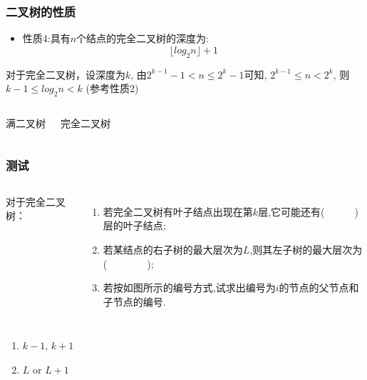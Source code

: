 \begin{frame}[fragile]
  \frametitle{二叉树的性质}
  \begin{itemize}
  \item 性质4:具有$n$个结点的完全二叉树的深度为:
    \[ \biggl\lfloor {log_2 n} \biggr\rfloor + 1 \] 
  \end{itemize}
  \small
  对于完全二叉树，设深度为$k$, 由$2^{k-1}-1 < n \leq 2^k - 1$可知,
  $2^{k-1} \leq n <2^k$, 则 $k-1 \leq log_2n < k$
  (参考性质2)
  
  \begin{columns}[T]
    
    满二叉树
    
    完全二叉树
  \end{columns}
\end{frame}

\begin{frame}[fragile]
  \frametitle{测试}

\begin{columns}[T]
    对于完全二叉树：
  \begin{enumerate}
  \item 若完全二叉树有叶子结点出现在第$k$层,它可能还有(~~~~~~)层的叶子结点;
  \item 若某结点的右子树的最大层次为$L$,则其左子树的最大层次为(~~~~~~~~);
  \item 若按如图所示的编号方式,试求出编号为$i$的节点的父节点和子节点的编号.
  \end{enumerate}

\end{columns}

\pause
\begin{enumerate}
\item $k-1$, $k+1$
\item $L$ or $L+1$
\end{enumerate}
\end{frame}


